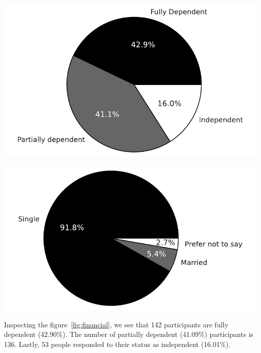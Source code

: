 \documentclass[a4paper,fleqn]{cas-sc}
\begin{document}
\begin{minipage}{.5\textwidth}
\centering
  \includegraphics[width=.9\linewidth]{figs/financial_dependency.pdf}
  \label{fig:financial}
\end{minipage}%
\begin{minipage}{.5\textwidth}
\centering
  \includegraphics[width=.9\linewidth]{figs/marital_status.pdf}
  \label{fig:marital}
\end{minipage}


Inspecting the figure~\ref{fig:financial}, we see that 142 participants are fully dependent (42.90\%). The number of partially dependent (41.09\%) participants is 136. Lastly, 53 people responded to their status as independent (16.01\%). 

\end{document}
